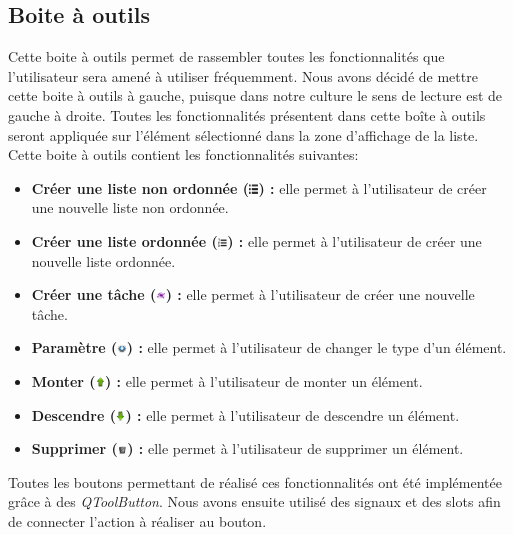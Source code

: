 \documentclass[a4paper,10pt]{article}
\begin{document}
\subsection{Boite à outils}
Cette boite à outils permet de rassembler toutes les fonctionnalités que l'utilisateur sera amené à utiliser fréquemment. Nous avons décidé de mettre cette boite à outils à gauche, puisque dans notre culture le sens de lecture est de gauche à droite. Toutes les fonctionnalités présentent dans cette boîte à outils seront appliquée sur l'élément sélectionné dans la zone d'affichage de la liste. Cette boite à outils contient les fonctionnalités suivantes:
\begin{itemize}
\item \textbf{Créer une liste non ordonnée (\includegraphics[width=0.25cm]{Images/list.png}) :} elle permet à l'utilisateur de créer une nouvelle liste non ordonnée.
\item \textbf{Créer une liste ordonnée (\includegraphics[width=0.25cm]{Images/list_ordered.png}) :} elle permet à l'utilisateur de créer une nouvelle liste ordonnée.
\item \textbf{Créer une tâche (\includegraphics[width=0.25cm]{Images/task.png}) :} elle permet à l'utilisateur de créer une nouvelle tâche.
\item \textbf{Paramètre (\includegraphics[width=0.25cm]{Images/gnome-system.png}) :} elle permet à l'utilisateur de changer le type d'un élément.
\item \textbf{Monter (\includegraphics[width=0.25cm]{Images/arrow_up.png}) :} elle permet à l'utilisateur de monter un élément.
\item \textbf{Descendre  (\includegraphics[width=0.25cm]{Images/arrow_down.png}) :} elle permet à l'utilisateur de descendre un élément.
\item \textbf{Supprimer  (\includegraphics[width=0.25cm]{Images/trash_empty.png}) :}  elle permet à l'utilisateur de supprimer un élément.
\end{itemize}
Toutes les boutons permettant de réalisé ces fonctionnalités ont été implémentée grâce à des \textit{QToolButton}. Nous avons ensuite utilisé des signaux et des slots afin de connecter l'action à réaliser au bouton.
\end{document}
